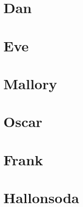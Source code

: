 \documentclass[a4paper]{scrreprt}
\begin{document}


\chapter{Dan}



\chapter{Eve}



\chapter{Mallory}



\chapter{Oscar}



\chapter{Frank}


\chapter{Hallonsoda}
\end{document}
